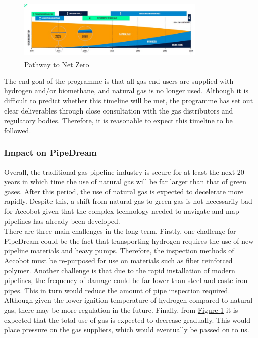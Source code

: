 \documentclass[11pt]{article}		%
\newcommand{\supercite}[1]{\textsuperscript{\cite{#1}}}		%
\newcommand{\figref}[1]{\hyperref[#1]{Figure \ref*{#1}}}    %
\begin{document}
    		\begin{figure}[h]
    			\centering
    			\includegraphics[width = 0.8\textwidth]{futureforecaset.jpg}
    			\caption{Pathway to Net Zero \supercite{gasgoesgreen} }	
    			\label{forecast}
    		\end{figure}
    		
    		The end goal of the programme is that all gas end-users are supplied with hydrogen and/or biomethane, and natural gas is no longer used. Although it is difficult to predict whether this timeline will be met, the programme has set out clear deliverables through close consultation with the gas distributors and regulatory bodies. Therefore, it is reasonable to expect this timeline to be followed. 
    
    		
    		\subsubsection[Impact on PipeDream]{Impact on PipeDream}
    		Overall, the traditional gas pipeline industry is secure for at least the next 20 years in which time the use of natural gas will be far larger than that of green gases. After this period, the use of natural gas is expected to decelerate more rapidly. Despite this, a shift from natural gas to green gas is not necessarily bad for Accobot given that the complex technology needed to navigate and map pipelines has already been developed. \\
    	    \hspace*{3ex}There are three main challenges in the long term. Firstly, one challenge for PipeDream could be the fact that transporting hydrogen requires the use of new pipeline materials and heavy pumps. Therefore, the inspection methods of Accobot must be re-purposed for use on materials such as fiber reinforced polymer. Another challenge is that due to the rapid installation of modern pipelines, the frequency of damage could be far lower than steel and caste iron pipes. This in turn would reduce the amount of pipe inspection required. Although given the lower ignition temperature of hydrogen compared to natural gas, there may be more regulation in the future. Finally, from \figref{forecast} it is expected that the total use of gas is expected to decrease gradually. This would place pressure on the gas suppliers, which would eventually be passed on to us. 
\end{document}
